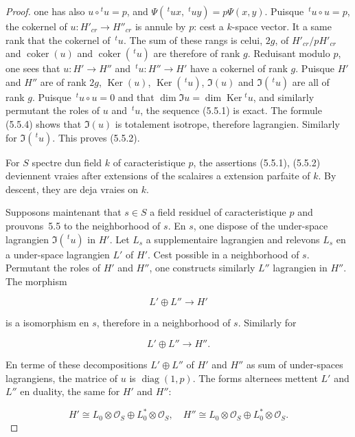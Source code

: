 \documentclass[11pt,a4paper]{article}
\theoremstyle{plain}
\theoremstyle{definition}
\DeclareMathOperator{\Ker}{Ker}
\DeclareMathOperator{\coker}{coker}
\DeclareMathOperator{\diag}{diag}
\begin{document}
\begin{proof}
one has also $u \circ \!^t u = p$, and $\Psi(\,\!^t u x, \; \!^t u y) = p \Psi(x, y)$.
Puisque $\,\!^t u \circ u = p$, the cokernel of $u: H'_{cr} \to H''_{cr}$ is annule by $p$: cest a
$k$-space vector. It a same rank that the cokernel of $\,\!^t u$. The sum of these rangs
is celui, $2g$, of $H'_{cr}/pH'_{cr}$ and $\coker(u)$ and $\coker(\,\!^t u)$ are therefore of rank $g$.
Reduisant modulo $p$, one sees that $u: H' \to H''$ and $\,\!^t u: H'' \to H'$ have a cokernel
of rank $g$. Puisque $H'$ and $H''$ are of rank $2g$, $\Ker(u)$, $\Ker(\,\!^t u)$, $\Im(u)$ and
$\Im(\,\!^t u)$ are all of rank $g$. Puisque $\,\!^t u \circ u = 0$
and that $\dim \Im u = \dim \Ker \!^t u$, and similarly
permutant the roles of $u$ and $\,\!^t u$, the sequence (5.5.1) is exact. The formule (5.5.4)
shows that $\Im(u)$ is totalement isotrope, therefore lagrangien. Similarly for
$\Im(\,\!^t u)$. This proves (5.5.2).

For $S$ spectre dun field $k$ of caracteristique $p$, the assertions (5.5.1), (5.5.2)
deviennent vraies after extensions of the scalaires a extension parfaite of $k$.
By descent, they are deja vraies on $k$.

Supposons maintenant that $s \in S$ a field residuel of caracteristique $p$ and
prouvons~5.5 to the neighborhood of $s$. En $s$, one dispose of the under-space lagrangien
$\Im(\,\!^t u)$ in $H'$. Let $L_s$ a supplementaire lagrangien and relevons $L_s$ en a
under-space lagrangien $L'$ of $H'$. Cest possible in a neighborhood of $s$. Permutant
the roles of $H'$ and $H''$, one constructs similarly $L''$ lagrangien in $H''$. The
morphism

\begin{equation}
L' \oplus L'' \longrightarrow H'
\end{equation}

is a isomorphism en $s$, therefore in a neighborhood of $s$. Similarly for

\begin{equation}
L' \oplus L'' \longrightarrow H''.
\end{equation}

En terme of these decompositions $L' \oplus L''$ of $H'$ and $H''$ as sum of
under-spaces lagrangiens, the matrice of $u$ is $\diag(1, p)$. The forms alternees
mettent $L'$ and $L''$ en duality, the same for $H'$ and $H''$:

\begin{equation}
H' \cong L_0 \otimes \mathscr{O}_S \oplus L_0^* \otimes \mathscr{O}_S, \quad H'' \cong L_0 \otimes \mathscr{O}_S \oplus L_0^* \otimes \mathscr{O}_S.
\end{equation}


\end{proof}
\end{document}
